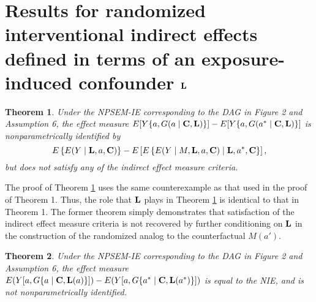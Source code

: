 \documentclass[12pt]{article}
\newtheorem{theorem}{Theorem}
\begin{document}
\section{Results for randomized interventional indirect effects defined in terms of an exposure-induced confounder $\bf L$}
\begin{theorem}
    \label{thm:NIE-RL}
    Under the NPSEM-IE corresponding to the DAG in Figure 2 and Assumption 6, the effect measure $E[Y\{a,G(a\mid {\bf C}, {\bf L})\}]-E[Y\{a,G(a^*\mid {\bf C}, {\bf L})\}]$ is nonparametrically identified by
    \[E\left\{E(Y\mid {\bf L}, a, {\bf C})\right\}-E\left[E\left\{E(Y\mid M, {\bf L}, a, {\bf C})\mid {\bf L}, a^*, {\bf C}\right\}\right],\]
    but does not satisfy any of the indirect effect measure criteria.
\end{theorem}
The proof of Theorem \ref{thm:NIE-RL} uses the same counterexample as that used in the proof of Theorem 1. Thus, the role that $\bf L$ plays in Theorem \ref{thm:NIE-RL} is identical to that in Theorem 1. The former theorem simply demonstrates that satisfaction of the indirect effect measure criteria is not recovered by further conditioning on $\bf L$ in the construction of the randomized analog to the counterfactual $M(a')$.
\begin{theorem}
    \label{thm:NIE-RLa}
    Under the NPSEM-IE corresponding to the DAG in Figure 2 and Assumption 6, the effect measure $E(Y[a,G\{a\mid {\bf C}, {\bf L}(a)\}])-E(Y[a,G\{a^*\mid {\bf C}, {\bf L}(a^*)\}])$ is equal to the NIE, and is not nonparametrically identified.
\end{theorem}
\end{document}
